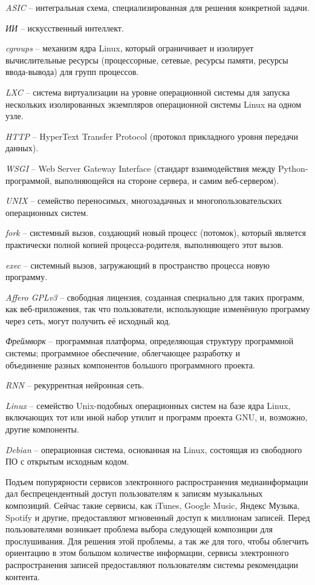 \emph{ASIC} -- интегральная схема, специализированная для решения конкретной задачи.

\emph{ИИ} -- искусственный интеллект.

\emph{cgroups} -- механизм ядра Linux, который ограничивает и изолирует вычислительные ресурсы (процессорные, сетевые, ресурсы памяти, ресурсы \\ввода-вывода) для групп процессов.

\emph{LXC} -- система виртуализации на уровне операционной системы для запуска нескольких изолированных экземпляров операционной системы Linux на одном узле.

\emph{HTTP} -- HyperText Transfer Protocol (протокол прикладного уровня передачи данных).

\emph{WSGI} -- Web Server Gateway Interface (стандарт взаимодействия между Python-программой, выполняющейся на стороне сервера, и самим веб-сервером).

\emph{UNIX} -- семейство переносимых, многозадачных и многопользовательских операционных систем.

\emph{fork} -- системный вызов, создающий новый процесс (потомок), который является практически полной копией процесса-родителя, выполняющего этот вызов.

\emph{exec} -- системный вызов, загружающий в пространство процесса новую программу.

\emph{Affero GPLv3} -- свободная лицензия, созданная специально для таких программ, как веб‐приложения, так что пользователи, использующие изменённую программу через сеть, могут получить её исходный код.

\emph{Фреймворк} -- программная платформа, определяющая структуру программной системы; программное обеспечение, облегчающее разработку и \\объе\-ди\-не\-ние разных компонентов большого программного проекта.

\emph{RNN} -- рекуррентная нейронная сеть.

\emph{Linux} -- семейство Unix-подобных операционных систем на базе ядра Linux, включающих тот или иной набор утилит и программ проекта GNU, и, возможно, другие компоненты.

\emph{Debian} -- операционная система, основанная на Linux, состоящая из свободного ПО с открытым исходным кодом.


\label{sec:introduction}


Подъем попурярности сервисов электронного распространения медиаинформации дал беспрецендентный доступ пользователям к записям музыкальных композиций. Сейчас такие сервисы, как iTunes, Google Music, Яндекс Музыка, Spotify и другие, предоставляют мгновенный доступ к миллионам записей. Перед пользователями возникает проблема выбора следующей композиции для прослушивания. Для решения этой проблемы, а так же для того, чтобы облегчить ориентацию в этом большом количестве информации, сервисы электронного распространения записей предоставляют пользователям системы рекомендации контента.

